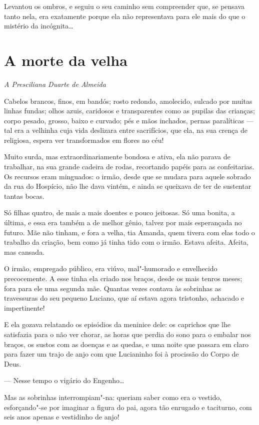 Levantou os ombros, e seguiu o seu caminho sem compreender que, se
pensava tanto nela, era exatamente porque ela não representava para ele
mais do que o mistério da incógnita\ldots{}

\chapter{A morte da velha}

\hfill{}\emph{A Presciliana Duarte de Almeida}

\bigskip

\noindent{}Cabelos brancos, finos, em bandós; rosto redondo, amolecido, sulcado por
muitas linhas fundas; olhos azuis, caridosos e transparentes como as
pupilas das crianças; corpo pesado, grosso, baixo e curvado; pés e mãos
inchados, pernas paralíticas --- tal era a velhinha cuja vida deslizara
entre sacrifícios, que ela, na sua crença de religiosa, espera ver
transformados em flores no céu!

Muito surda, mas extraordinariamente bondosa e ativa, ela não parava de
trabalhar, na sua grande cadeira de rodas, recortando papéis para as
confeitarias. Os recursos eram minguados: o irmão, desde que se mudara
para aquele sobrado da rua do Hospício, não lhe dava vintém, e ainda se
queixava de ter de sustentar tantas bocas.

Só filhas quatro, de mais a mais doentes e pouco jeitosas. Só uma
bonita, a última, e essa era também a de melhor gênio, talvez por mais
esperançada no futuro. Mãe não tinham, e fora a velha, tia Amanda, quem
tivera com elas todo o trabalho da criação, bem como já tinha tido com o
irmão. Estava afeita. Afeita, mas cansada.

O irmão, empregado público, era viúvo, mal"-humorado e envelhecido
precocemente. A esse tinha ela criado nos braços, desde os mais tenros
meses; fora para ele uma segunda mãe. Quantas vezes contava às sobrinhas
as travessuras do seu pequeno Luciano, que aí estava agora tristonho,
achacado e impertinente!

E ela gozava relatando os episódios da meninice dele: os caprichos que
lhe satisfazia para o não ver chorar, as horas que perdia do sono para o
embalar nos braços, os sustos com as doenças e as quedas, e uma noite
que passara em claro para fazer um trajo de anjo com que Lucianinho foi
à procissão do Corpo de Deus.

--- Nesse tempo o vigário do Engenho\ldots{}

Mas as sobrinhas interrompiam"-na: queriam saber como era o vestido,
esforçando"-se por imaginar a figura do pai, agora tão enrugado e
taciturno, com seis anos apenas e vestidinho de anjo!

